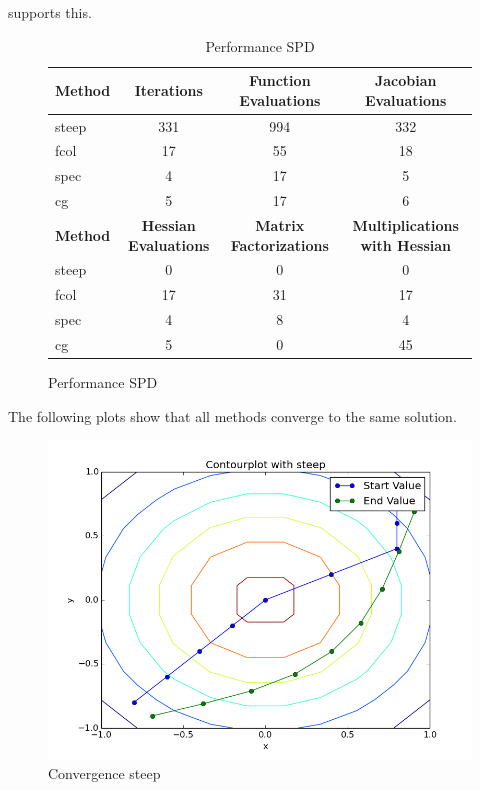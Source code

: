 \documentclass{article}
\begin{document}
supports this.
\begin{figure}
\begin{table}[H]
  \centering
  \begin{tabular}{|l|c|c|c|}
    \hline
   \textbf{Method} & \textbf{Iterations} & \textbf{Function Evaluations} &\textbf{Jacobian Evaluations} \\ \hline
   steep &331 &994 &332 \\ \hline
   fcol &17 &55 &18 \\ \hline
   spec &4 &17 &5 \\ \hline
   cg &5 &17 &6 \\ \hline
 \textbf{Method} & \textbf{Hessian Evaluations} & \textbf{Matrix Factorizations} & \textbf{Multiplications with Hessian} \\ \hline
 steep &0 & 0 & 0 \\ \hline
   fcol &17 &31 &17 \\ \hline
   spec &4 &8 &4 \\ \hline
   cg &5 &0 &45 \\ \hline
  \end{tabular}
  \caption{Performance SPD}
  \label{tab:perform3}
\end{table}
\end{figure}
The following plots show that all methods converge to the same solution.
\begin{figure}[H]
  \centering
  \includegraphics[scale=0.5]{2steep.png}
  \caption{Convergence steep}
\end{figure}
\end{document}
